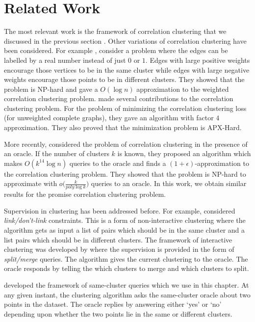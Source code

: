 \documentclass[12pt]{article}
\begin{document}
\section{Related Work}
The most relevant work is the framework of correlation clustering that we discussed in the previous section \cite{bansal2004correlation}. Other variations of correlation clustering have been considered. For example \cite{demaine2006correlation}, consider a problem where the edges can be labelled by a real number instead of just $0$ or $1$. Edges with large positive weights encourage those vertices to be in the same cluster while edges with large negative weights encourage those points to be in different clusters. They showed that the problem is NP-hard and gave a $O(\log n)$ approximation to the weighted correlation clustering problem. \cite{charikar2005clustering} made several contributions to the correlation clustering problem. For the problem of minimizing the correlation clustering loss (for unweighted complete graphs), they gave an algorithm with factor $4$ approximation. They also proved that the minimization problem is APX-Hard. 

More recently, \cite{ailon2018approximate} considered the problem of correlation clustering in the presence of an oracle. If the number of clusters $k$ is known, they proposed an algorithm which makes $O(k^{14} \log n)$ queries to the oracle and finds a $(1+\epsilon)$-approximation to the correlation clustering problem. They showed that the problem is NP-hard to approximate with $o\big(\frac{k}{poly \log k}\big)$ queries to an oracle. In this work, we obtain similar results for the {promise correlation clustering} problem.

Supervision in clustering has been addressed before. For example, \cite{kulis2009semi,basu2004probabilistic,basu2002semi} considered {\em link/don't-link} constraints. This is a form of non-interactive clustering where the algorithm gets as input a list of pairs which should be in the same cluster and a list pairs which should be in different clusters. The framework of interactive clustering was developed by \cite{balcan2008clustering} where the supervision is provided in the form of {\em split/merge} queries. The algorithm gives the current clustering to the oracle. The oracle responds by telling the which clusters to merge and which clusters to split. 

\cite{ashtiani2016clustering} developed the framework of same-cluster queries which we use in this chapter. At any given instant, the clustering algorithm asks the same-cluster oracle about two points in the dataset. The oracle replies by answering either `yes' or `no' depending upon whether the two points lie in the same or different clusters. 
\end{document}
